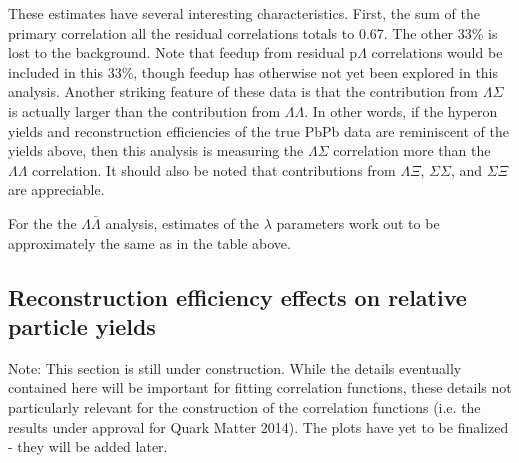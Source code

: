 These estimates have several interesting characteristics.  
First, the sum of the primary correlation all the residual correlations totals to 0.67.  
The other 33\% is lost to the background.  
Note that feedup from residual p$\Lambda$ correlations would be included in this 33\%, though feedup has otherwise not yet been explored in this analysis. 
Another striking feature of these data is that the contribution from $\Lambda\Sigma$ is actually larger than the contribution from $\Lambda\Lambda$.  
In other words, if the hyperon yields and reconstruction efficiencies of the true PbPb data are reminiscent of the yields above, then this analysis is measuring the $\Lambda\Sigma$ correlation more than the $\Lambda\Lambda$ correlation.  
It should also be noted that contributions from $\Lambda\Xi$, $\Sigma\Sigma$, and $\Sigma\Xi$ are appreciable.

For the the $\Lambda\bar{\Lambda}$ analysis, estimates of the $\lambda$ parameters work out to be approximately the same as in the table above.

\subsection{Reconstruction efficiency effects on relative particle yields}
\label{sec:ReconstructionEff}

Note: This section is still under construction.  
While the details eventually contained here will be important for fitting correlation functions, these details not particularly relevant for the construction of the correlation functions (i.e. the results under approval for Quark Matter 2014).  
The plots have yet to be finalized - they will be added later.

